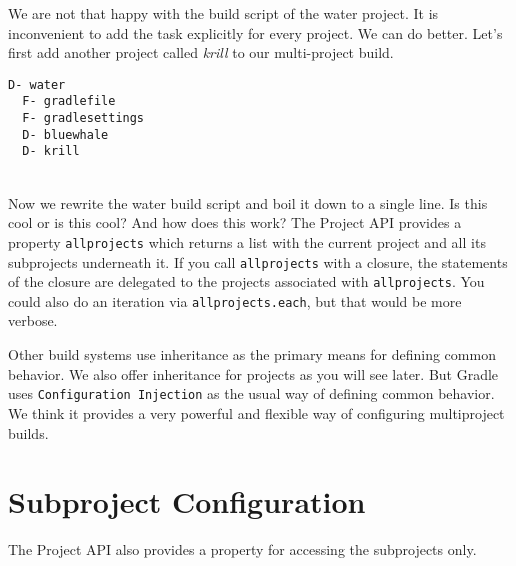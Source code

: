 We are not that happy with the build script of the water project. It is inconvenient to add the task explicitly for every project. We can do better. Let's first add another project called \emph{krill} to our multi-project build.

\begin{minipage}[t]{7cm}
\begin{Verbatim}[frame=single,label=Project Tree]
D- water
  F- gradlefile
  F- gradlesettings
  D- bluewhale
  D- krill	
\end{Verbatim}
\end{minipage}	
\begin{minipage}[t]{9cm}
\end{minipage}
\\

\noindent Now we rewrite the water build script and boil it down to a single line.
Is this cool or is this cool? And how does this work? The Project API provides a property \texttt{allprojects} which returns a list with the current project and all its subprojects underneath it. If you call \texttt{allprojects} with a closure, the statements of the closure are delegated to the projects associated with \texttt{allprojects}. You could also do an iteration via \texttt{allprojects.each}, but that would be more verbose.
\\

\begin{graybox}
Other build systems use inheritance as the primary means for defining common behavior. We also offer inheritance for projects as you will see later. But Gradle uses \texttt{Configuration Injection} as the usual way of defining common behavior. We think it provides a very powerful and flexible way of configuring multiproject builds.	
\end{graybox}

\section{Subproject Configuration} %
\label{sec:subproject_configuration}
\noindent The Project API also provides a property for accessing the subprojects only. 

